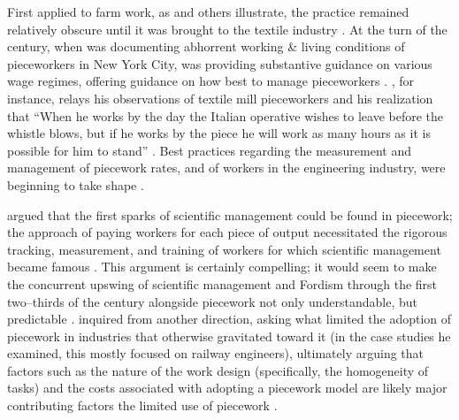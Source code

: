 \documentclass[trackingWork]{subfiles}
\begin{document}


First applied to farm work, as
\citeauthor{hughRaynbirdTaskWork} and others illustrate,
the practice remained relatively obscure until
it was brought to the textile industry
\cite{hughRaynbirdTaskWork}.
At the turn of the  century,
when \citeauthor{riisOtherSideLives} was documenting abhorrent working \& living conditions of pieceworkers in New York City,
\citeauthor{norton1900textile} was providing substantive guidance on various wage regimes,
offering guidance on how best to manage pieceworkers
\cite{riisOtherSideLives,norton1900textile}.
\citeauthor{clark1908cotton}, for instance,
relays his observations of textile mill pieceworkers and his realization that
``When he works by the day the Italian operative wishes to leave before the whistle blows,
but if he works by the piece he will work as many hours as it is possible for him to stand''
\cite{clark1908cotton}.
Best practices regarding the measurement and management of
piecework rates, and of workers in the engineering industry,
were beginning to take shape
\cite{burton1899commercial}.

\citeauthor{10.2307/23702539} argued that the first sparks of scientific management
could be found in piecework;
the approach of paying workers for each piece of output necessitated
the rigorous tracking, measurement, and training of workers
for which scientific management became famous
\cite{10.2307/23702539}.
This argument is certainly compelling;
it would seem to make the concurrent upswing of
scientific management and Fordism
through the first two--thirds of the  century
alongside piecework not only understandable, but predictable
\cite{hart2013rise}.
\citeauthor{Brown01041990} inquired from another direction, asking
what limited the adoption of piecework in industries that otherwise gravitated toward it
(in the case studies he examined, this mostly focused on railway engineers),
ultimately arguing that factors such as the nature of the work design
(specifically, the homogeneity of tasks) and the costs associated with adopting a piecework model
are likely major contributing factors the limited use of piecework
\cite{Brown01041990}.
\end{document}
